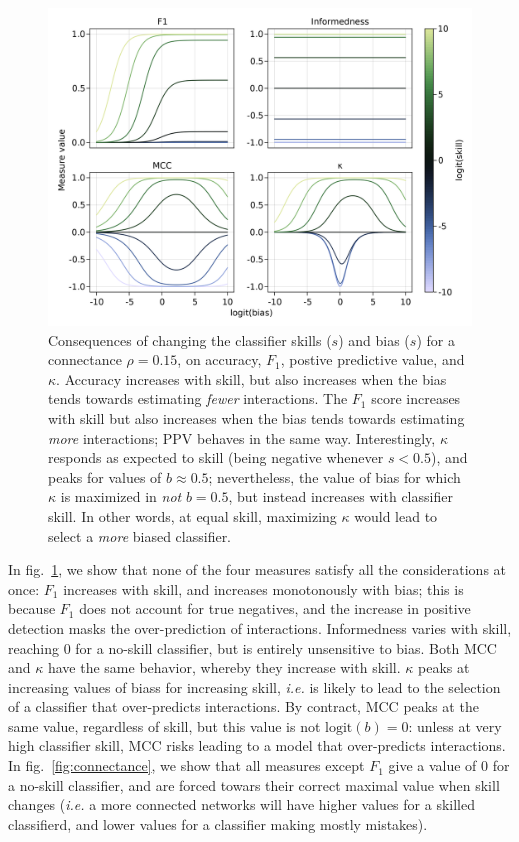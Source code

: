 \documentclass[10pt,oneside]{article}
\makeatletter
\def\maxwidth{\ifdim\Gin@nat@width>\linewidth\linewidth
\else\Gin@nat@width\fi}
\let\Oldincludegraphics\includegraphics
\renewcommand{\includegraphics}[1]{\Oldincludegraphics[width=\maxwidth]{#1}}
\makeatother
\begin{document}
\begin{figure}
\hypertarget{fig:bias}{%
\centering
\includegraphics{figures/changing-bias.png}
\caption{Consequences of changing the classifier skills (\(s\)) and bias
(\(s\)) for a connectance \(\rho=0.15\), on accuracy, \(F_1\), postive
predictive value, and \(\kappa\). Accuracy increases with skill, but
also increases when the bias tends towards estimating \emph{fewer}
interactions. The \(F_1\) score increases with skill but also increases
when the bias tends towards estimating \emph{more} interactions; PPV
behaves in the same way. Interestingly, \(\kappa\) responds as expected
to skill (being negative whenever \(s < 0.5\)), and peaks for values of
\(b \approx 0.5\); nevertheless, the value of bias for which \(\kappa\)
is maximized in \emph{not} \(b=0.5\), but instead increases with
classifier skill. In other words, at equal skill, maximizing \(\kappa\)
would lead to select a \emph{more} biased classifier.}\label{fig:bias}
}
\end{figure}

In fig.~\ref{fig:bias}, we show that none of the four measures satisfy
all the considerations at once: \(F_1\) increases with skill, and
increases monotonously with bias; this is because \(F_1\) does not
account for true negatives, and the increase in positive detection masks
the over-prediction of interactions. Informedness varies with skill,
reaching 0 for a no-skill classifier, but is entirely unsensitive to
bias. Both MCC and \(\kappa\) have the same behavior, whereby they
increase with skill. \(\kappa\) peaks at increasing values of biass for
increasing skill, \emph{i.e.} is likely to lead to the selection of a
classifier that over-predicts interactions. By contract, MCC peaks at
the same value, regardless of skill, but this value is not
\(\text{logit}(b)=0\): unless at very high classifier skill, MCC risks
leading to a model that over-predicts interactions. In
fig.~\ref{fig:connectance}, we show that all measures except \(F_1\)
give a value of 0 for a no-skill classifier, and are forced towars their
correct maximal value when skill changes (\emph{i.e.} a more connected
networks will have higher values for a skilled classifierd, and lower
values for a classifier making mostly mistakes).
\end{document}
